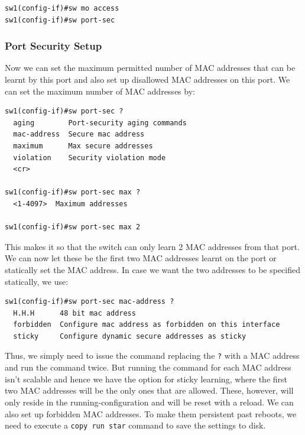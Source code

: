\vspace{-15pt}
\begin{verbatim}
sw1(config-if)#sw mo access
sw1(config-if)#sw port-sec
\end{verbatim}
\vspace{-10pt}

\subsubsection{Port Security Setup}
\vspace{-10pt}
Now we can set the maximum permitted number of MAC addresses that can be learnt by this port and also set up disallowed MAC addresses on this port. We can set the maximum number of MAC addresses by:

\vspace{-15pt}
\begin{verbatim}
sw1(config-if)#sw port-sec ?
  aging        Port-security aging commands
  mac-address  Secure mac address
  maximum      Max secure addresses
  violation    Security violation mode
  <cr>

sw1(config-if)#sw port-sec max ?
  <1-4097>  Maximum addresses
  
sw1(config-if)#sw port-sec max 2  
\end{verbatim}
\vspace{-10pt}

\noindent
This makes it so that the switch can only learn 2 MAC addresses from that port. We can now let these be the first two MAC addresses learnt on the port or statically set the MAC address. In case we want the two addresses to be specified statically, we use: 

\vspace{-15pt}
\begin{verbatim}
sw1(config-if)#sw port-sec mac-address ?
  H.H.H      48 bit mac address
  forbidden  Configure mac address as forbidden on this interface
  sticky     Configure dynamic secure addresses as sticky
\end{verbatim}
\vspace{-10pt}

\noindent
Thus, we simply need to issue the command replacing the \verb|?| with a MAC address and run the command twice. But running the command for each MAC address isn't scalable and hence we have the option for sticky learning, where the first two MAC addresses will be the only ones that are allowed. These, however, will only reside in the running-configuration and will be reset with a reload. We can also set up forbidden MAC addresses. To make them persistent past reboots, we need to execute a \verb|copy run star| command to save the settings to disk. 

